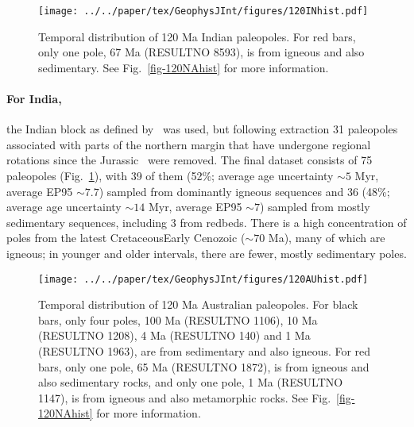 \begin{figure}[tbp]
  \centering
  \texttt{[image: ../../paper/tex/GeophysJInt/figures/120INhist.pdf]}
\end{figure}
\begin{figure}[!ht]
  \addtocounter{figure}{1}
  \ContinuedFloat\caption[Distribution of 120 Ma Indian paleopoles]{Temporal
    distribution of 120 Ma Indian paleopoles. For red bars, only one
    pole, 67 Ma (RESULTNO 8593), is from igneous and also
    sedimentary. See Fig.~\ref{fig-120NAhist} for more information.}\label{fig-120INhist}
\end{figure}

\paragraph{For India,}
the Indian block as defined by~\citet{Y18} was used, but following extraction 31
paleopoles associated with parts of the northern margin that have undergone
regional rotations since the Jurassic~\citep{G15} were removed. The final
dataset consists of 75 paleopoles (Fig.~\ref{fig-120INhist}), with 39 of them
(52\%; average age uncertainty ${\sim}5$ Myr, average EP95 ${\sim}7.7$\degree)
sampled from dominantly igneous sequences and 36 (48\%; average age uncertainty
${\sim}14$ Myr, average EP95 ${\sim}7$\degree) sampled from mostly sedimentary
sequences, including 3 from redbeds. There is a high concentration of poles from
the latest Cretaceous\textendash{}Early Cenozoic (${\sim}70$ Ma),
many of which are igneous; in younger and older intervals, there are fewer,
mostly sedimentary poles.

\begin{figure}
  \centering
  \texttt{[image: ../../paper/tex/GeophysJInt/figures/120AUhist.pdf]}
\end{figure}
\begin{figure}[!ht]
  \addtocounter{figure}{1}
  \ContinuedFloat\caption[Distribution of 120 Ma Australian paleopoles]{Temporal
    distribution of 120 Ma Australian paleopoles. For black bars,
    only four poles, 100 Ma (RESULTNO 1106), 10 Ma
    (RESULTNO 1208), 4 Ma (RESULTNO 140) and 1 Ma
    (RESULTNO 1963), are from sedimentary and also igneous. For red bars, only
    one pole, 65 Ma (RESULTNO 1872), is from igneous and also
    sedimentary rocks, and only one pole, 1 Ma (RESULTNO 1147), is
    from igneous and also metamorphic rocks. See Fig.~\ref{fig-120NAhist} for
    more information.}\label{fig-120AUhist}
\end{figure}

